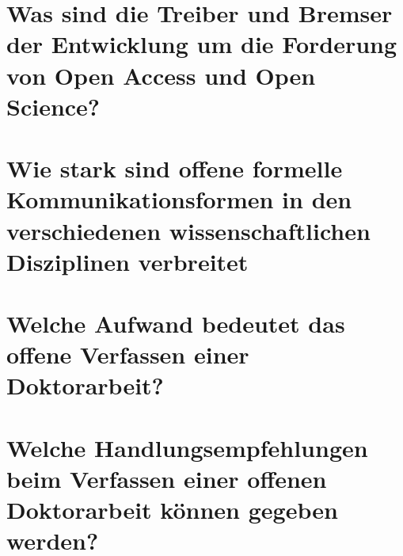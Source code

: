 \section{Was sind die Treiber und Bremser der Entwicklung um die Forderung von Open Access und Open Science?} 

\section{Wie stark sind offene formelle Kommunikationsformen in den verschiedenen wissenschaftlichen Disziplinen verbreitet}  

\section{Welche Aufwand bedeutet das offene Verfassen einer Doktorarbeit?} 

\section{Welche Handlungsempfehlungen beim Verfassen einer offenen Doktorarbeit können gegeben werden?} 